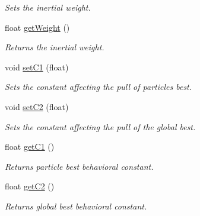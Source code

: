 \begin{DoxyCompactItemize}
\begin{DoxyCompactList}\small\item\em Sets the inertial weight. \end{DoxyCompactList}\item 
\mbox{\label{class_swarm_a690d1c6e3e0836be6a01149188703f64}} 
float \mbox{\hyperlink{class_swarm_a690d1c6e3e0836be6a01149188703f64}{get\+Weight}} ()
\begin{DoxyCompactList}\small\item\em Returns the inertial weight. \end{DoxyCompactList}\item 
\mbox{\label{class_swarm_a1ffb11d74e5e7241dee7d977d20c4419}} 
void \mbox{\hyperlink{class_swarm_a1ffb11d74e5e7241dee7d977d20c4419}{set\+C1}} (float)
\begin{DoxyCompactList}\small\item\em Sets the constant affecting the pull of particles\textquotesingle{} best. \end{DoxyCompactList}\item 
\mbox{\label{class_swarm_ac9cc13ae5b9f2d323c0cf272d5c864d6}} 
void \mbox{\hyperlink{class_swarm_ac9cc13ae5b9f2d323c0cf272d5c864d6}{set\+C2}} (float)
\begin{DoxyCompactList}\small\item\em Sets the constant affecting the pull of the global best. \end{DoxyCompactList}\item 
\mbox{\label{class_swarm_ae765514e3fbe727b2a09b80eee2d0b4c}} 
float \mbox{\hyperlink{class_swarm_ae765514e3fbe727b2a09b80eee2d0b4c}{get\+C1}} ()
\begin{DoxyCompactList}\small\item\em Returns particle best behavioral constant. \end{DoxyCompactList}\item 
\mbox{\label{class_swarm_a64d43500d3ff5a487016b3ee508c4954}} 
float \mbox{\hyperlink{class_swarm_a64d43500d3ff5a487016b3ee508c4954}{get\+C2}} ()
\begin{DoxyCompactList}\small\item\em Returns global best behavioral constant. \end{DoxyCompactList}\item 

\end{DoxyCompactItemize}

